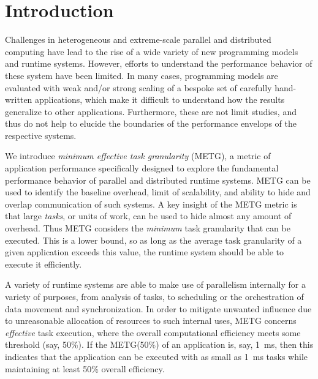 \section{Introduction}
\label{sec:introduction}

Challenges in heterogeneous and extreme-scale parallel and distributed
computing have lead to the rise of a wide variety of new programming
models and runtime systems. However, efforts to understand the
performance behavior of these system have been limited. In many cases,
programming models are evaluated with weak and/or strong scaling of a
bespoke set of carefully hand-written applications, which make it
difficult to understand how the results generalize to other
applications. Furthermore, these are not limit studies, and thus do
not help to elucide the boundaries of the performance envelops of the
respective systems.

We introduce \emph{minimum effective task granularity} (METG), a
metric of application performance specifically designed to explore the
fundamental performance behavior of parallel and distributed runtime
systems. METG can be used to identify the baseline overhead, limit of
scalability, and ability to hide and overlap communication of such
systems. A key insight of the METG metric is that large \emph{tasks},
or units of work, can be used to hide almost any amount of
overhead. Thus METG considers the \emph{minimum} task granularity that
can be executed. This is a lower bound, so as long as the average task
granularity of a given application exceeds this value, the runtime
system should be able to execute it efficiently.

A variety of runtime systems are able to make use of parallelism
internally for a variety of purposes, from analysis of tasks, to
scheduling or the orchestration of data movement and
synchronization. In order to mitigate unwanted influence due to
unreasonable allocation of resources to such internal uses, METG
concerns \emph{effective} task execution, where the overall
computational efficiency meets some threshold (say, 50\%). If the
METG(50\%) of an application is, say, 1~ms, then this indicates that
the application can be executed with as small as 1~ms tasks while
maintaining at least 50\% overall efficiency.

